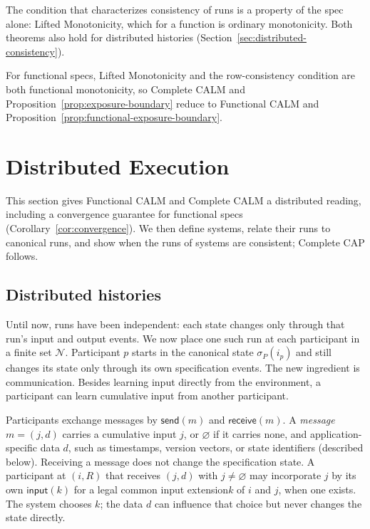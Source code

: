 \documentclass[sigconf]{cidr-2027}
\theoremstyle{remark}
\newcommand{\indesc}{input extension\xspace} %
\begin{document}
The condition that characterizes consistency of runs is a property of the spec
alone: Lifted Monotonicity, which for a function is ordinary monotonicity. Both theorems also hold for distributed histories
(Section~\ref{sec:distributed-consistency}).

For functional specs, Lifted Monotonicity and the row-consistency condition
are both functional monotonicity, so Complete CALM and
Proposition~\ref{prop:exposure-boundary} reduce to Functional CALM and
Proposition~\ref{prop:functional-exposure-boundary}.

\section{Distributed Execution}
\label{sec:distributed-execution}

\textcolor{reviewed}{This section gives Functional CALM and Complete CALM a distributed reading,
including a convergence guarantee for functional specs
(Corollary~\ref{cor:convergence}).} We then define systems, relate their runs to
canonical runs, and show when the runs of systems are consistent; Complete CAP follows.


\subsection{Distributed histories}
\label{sec:histories}

\textcolor{reviewed}{Until now, runs have been independent: each state changes only through that
run's input and output events.} \textcolor{reviewed}{We now place one such run at each participant in
a finite set $\mathcal N$.} \textcolor{reviewed}{Participant $p$ starts in the canonical state
$\sigma_P(i_p)$ and still changes its state only through its own specification
events.} \textcolor{reviewed}{The new ingredient is communication.} \textcolor{reviewed}{Besides learning input directly
from the environment, a participant can learn cumulative input from another
participant.}

\textcolor{reviewed}{Participants exchange messages by $\mathsf{send}(m)$ and
$\mathsf{receive}(m)$.} \textcolor{reviewed}{A \emph{message} $m=(j,d)$ carries a cumulative input $j$, or $\varnothing$ if it
carries none, and application-specific data $d$, such as timestamps, version
vectors, or state identifiers (described below).} \textcolor{reviewed}{Receiving a message does not
change the specification state.} A participant at $(i,R)$ that receives $(j,d)$ with
$j\neq\varnothing$ may incorporate $j$ by its own $\mathsf{input}(k)$ for a
legal common \indesc $k$ of $i$ and $j$, when one exists. \textcolor{reviewed}{The system chooses $k$; the data $d$ can influence that choice but never
changes the state directly.}
\end{document}
